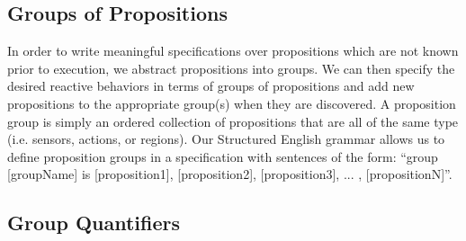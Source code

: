 \subsection{Groups of Propositions} 

In order to write meaningful specifications over propositions which are not known prior to execution, we abstract propositions into groups. We can then specify the desired reactive behaviors in terms of groups of propositions and add new propositions to the appropriate group(s) when they are discovered. A proposition group is simply an ordered collection of propositions that are all of the same type (i.e. sensors, actions, or regions). Our Structured English grammar allows us to define proposition groups in a specification with sentences of the form: ``group [groupName] is [proposition1], [proposition2], [proposition3], ... , [propositionN]''. 

\subsection{Group Quantifiers} 

